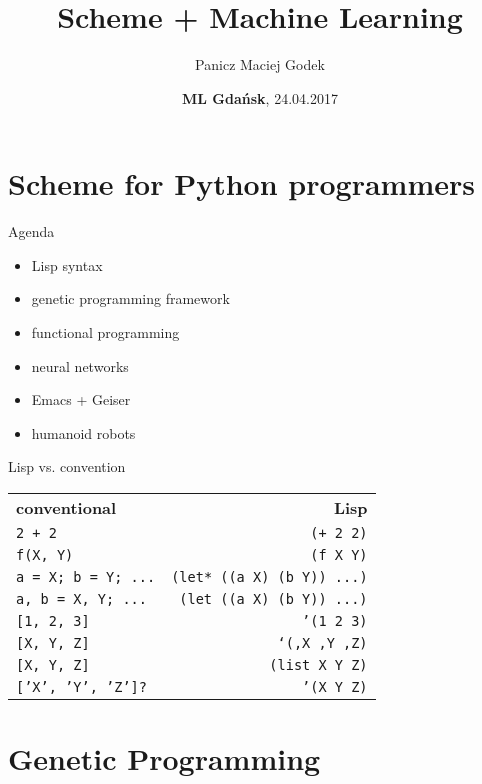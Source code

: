 \documentclass{beamer}
\title{\textbf{Scheme + Machine Learning}}
\author{Panicz Maciej Godek}
\institute{
  \tiny{\href{mailto:godek.maciek@gmail.com}{\textbf{godek.maciek@gmail.com}}} \\
  \normalsize{\url{https://github.com/panicz/writings/tree/master/talks/mlgdansk}}
}
\date{\textbf{ML Gdańsk}, 24.04.2017}
\begin{document}
\begin{frame}
  \titlepage
\end{frame}

\section{Scheme for Python programmers}

\begin{frame}{Agenda}
  \begin{itemize} \pause
  \item Lisp syntax \pause
  \item genetic programming framework \pause
  \item functional programming \pause
  \item neural networks \pause
  \item Emacs + Geiser \pause
  \item humanoid robots
  \end{itemize}
\end{frame}


\begin{frame}{Lisp vs. convention}
  \begin{tabular}{ l r }
    \textbf{conventional} & \textbf{Lisp} \\ \pause
    \texttt{2 + 2} & \texttt{(+ 2 2)} \\ \pause
    \texttt{f(X, Y)} & \texttt{(f X Y)} \\ \pause
    \texttt{a = X; b = Y; ...} & \texttt{(let* ((a X) (b Y)) ...)} \\ \pause
    \texttt{a, b = X, Y; ...} & \texttt{(let ((a X) (b Y)) ...)} \\ \pause
    \texttt{[1, 2, 3]} & \texttt{'(1 2 3)} \\ \pause
    \texttt{[X, Y, Z]} & \texttt{`(,X ,Y ,Z)} \\ \pause
    \texttt{[X, Y, Z]} & \texttt{(list X Y Z)} \\ \pause
    \texttt{['X', 'Y', 'Z']?} & \texttt{'(X Y Z)} \\
  \end{tabular}
\end{frame}

\section{Genetic Programming}
\end{document}
